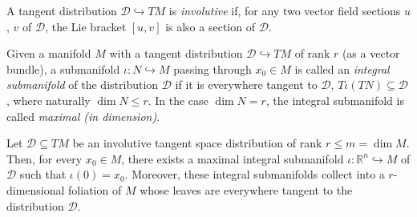 \begin{definition} \label{def:inv-distr}
A tangent distribution $\mathcal{D} \hookrightarrow TM$ is \emph{involutive} if,
for any two vector field sections $u$, $v$ of $\mathcal{D}$, the Lie bracket
$[u,v]$ is also a section of $\mathcal{D}$.
\end{definition}

\begin{definition} \label{def:int-subman}
Given a manifold $M$ with a tangent distribution $\mathcal{D} \hookrightarrow
TM$ of rank $r$ (as a vector bundle), a submanifold $\iota\colon N
\hookrightarrow M$ passing through $x_0 \in M$ is called an \emph{integral
submanifold} of the distribution $\mathcal{D}$ if it is everywhere tangent to
$\mathcal{D}$, $T\iota (TN) \subseteq \mathcal{D}$, where naturally $\dim N \le
r$. In the case $\dim N = r$, the integral submanifold is called \emph{maximal
(in dimension)}.
\end{definition}

\begin{definition}[foliation] \label{def:foliation}
\notready
\end{definition}

\begin{theorem} \label{thm:frob-vec}
Let $\mathcal{D} \subseteq TM$ be an involutive tangent space distribution of
rank $r\le m = \dim M$. Then, for every $x_0\in M$, there exists a maximal
integral submanifold $\iota\colon \mathbb{R}^n \hookrightarrow M$ of
$\mathcal{D}$ such that $\iota(0) = x_0$. Moreover, these integral submanifolds
collect into a $r$-dimensional foliation of $M$ whose leaves are everywhere
tangent to the distribution $\mathcal{D}$.
\end{theorem}
